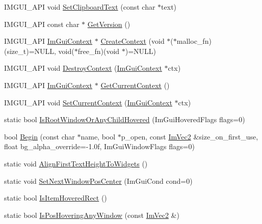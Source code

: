 \begin{DoxyCompactItemize}
\item 
I\+M\+G\+U\+I\+\_\+\+A\+PI void \hyperlink{namespace_im_gui_aa4824a1b351c063b4aff9b9f4fb5fd4d}{Set\+Clipboard\+Text} (const char $\ast$text)
\item 
I\+M\+G\+U\+I\+\_\+\+A\+PI const char $\ast$ \hyperlink{namespace_im_gui_a6488c3cfa6331c8a1e93769e580ce020}{Get\+Version} ()
\item 
I\+M\+G\+U\+I\+\_\+\+A\+PI \hyperlink{struct_im_gui_context}{Im\+Gui\+Context} $\ast$ \hyperlink{namespace_im_gui_a98a4fecf50da4fb3489cee71a72cc577}{Create\+Context} (void $\ast$($\ast$malloc\+\_\+fn)(size\+\_\+t)=N\+U\+LL, void($\ast$free\+\_\+fn)(void $\ast$)=N\+U\+LL)
\item 
I\+M\+G\+U\+I\+\_\+\+A\+PI void \hyperlink{namespace_im_gui_a344adba8bd84069dc7425b88306411c7}{Destroy\+Context} (\hyperlink{struct_im_gui_context}{Im\+Gui\+Context} $\ast$ctx)
\item 
I\+M\+G\+U\+I\+\_\+\+A\+PI \hyperlink{struct_im_gui_context}{Im\+Gui\+Context} $\ast$ \hyperlink{namespace_im_gui_af557a6de5538099a0f6047eb994bbf42}{Get\+Current\+Context} ()
\item 
I\+M\+G\+U\+I\+\_\+\+A\+PI void \hyperlink{namespace_im_gui_a289dbbbffdadcf1231821d97a7c4a9be}{Set\+Current\+Context} (\hyperlink{struct_im_gui_context}{Im\+Gui\+Context} $\ast$ctx)
\item 
static bool \hyperlink{namespace_im_gui_a048d3ecb7eb03f3416900dfbaac09d3f}{Is\+Root\+Window\+Or\+Any\+Child\+Hovered} (Im\+Gui\+Hovered\+Flags flags=0)
\item 
bool \hyperlink{namespace_im_gui_a288e01ff1c8102d6374a6b1e409b9878}{Begin} (const char $\ast$name, bool $\ast$p\+\_\+open, const \hyperlink{struct_im_vec2}{Im\+Vec2} \&size\+\_\+on\+\_\+first\+\_\+use, float bg\+\_\+alpha\+\_\+override=-\/1.\+0f, Im\+Gui\+Window\+Flags flags=0)
\item 
static void \hyperlink{namespace_im_gui_a0c1fd13ae89c240fb7547e244d672f9b}{Align\+First\+Text\+Height\+To\+Widgets} ()
\item 
static void \hyperlink{namespace_im_gui_a0d59dc9582f20c086d7882c86a41e8f2}{Set\+Next\+Window\+Pos\+Center} (Im\+Gui\+Cond cond=0)
\item 
static bool \hyperlink{namespace_im_gui_a3be4bc9167af21ffe603bce68c94b947}{Is\+Item\+Hovered\+Rect} ()
\item 
static bool \hyperlink{namespace_im_gui_a5d6182f4b163a2de64bc2a27d594c201}{Is\+Pos\+Hovering\+Any\+Window} (const \hyperlink{struct_im_vec2}{Im\+Vec2} \&)
\item 

\end{DoxyCompactItemize}
